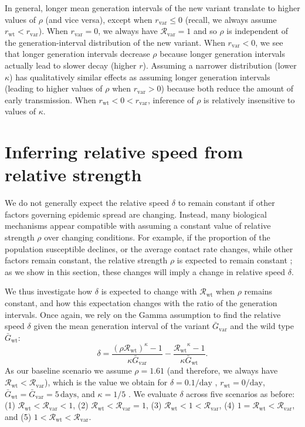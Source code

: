 \documentclass[12pt]{article}
\newcommand{\vvvar}{\mathrm{var}}
\newcommand{\wwwt}{\mathrm{wt}}
\newcommand{\rx}[1]{\ensuremath{{r}_{#1}}\xspace}
\newcommand{\rw}{\rx{\wwwt}}
\newcommand{\rv}{\rx{\vvvar}}
\newcommand{\Rx}[1]{\ensuremath{{\mathcal R}_{#1}}\xspace}
\newcommand{\Rw}{\Rx{\wwwt}}
\newcommand{\Rv}{\Rx{\vvvar}}
\newcommand{\pday}{\ensuremath{/\textrm{day}}}
\newcommand{\Gx}[1]{\ensuremath{{\bar G}_{#1}}\xspace}
\newcommand{\Gw}{\Gx{\wwwt}}
\newcommand{\Gv}{\Gx{\vvvar}}
\begin{document}
In general, longer mean generation intervals of the new variant translate to higher values of $\rho$ (and vice versa), except when $\rv \leq 0$ (recall, we always assume $\rw<\rv$).
When $\rv = 0$, we always have $\Rv = 1$ and so $\rho$ is independent of the generation-interval distribution of the new variant.
When $\rv < 0$, we see that longer generation intervals decrease $\rho$ because longer generation intervals actually lead to slower decay (higher $r$).
Assuming a narrower distribution (lower $\kappa$) has qualitatively similar effects as assuming longer generation intervals (leading to higher values of $\rho$ when $\rv > 0$) because both reduce the amount of early transmission.
When $\rw < 0 < \rv$, inference of $\rho$ is relatively insensitive to values of $\kappa$.

\section{Inferring relative speed from relative strength}

We do not generally expect the relative speed $\delta$ to remain constant if other factors governing epidemic spread are changing.
Instead, many biological mechanisms appear compatible with assuming a constant value of relative strength $\rho$ over changing conditions.
For example, if the proportion of the population susceptible declines, or the average contact rate changes, while other factors remain constant, the relative strength $\rho$ is expected to remain constant \citep{leung2017monitoring,leung2020empirical,di2021impact,leung2021early}; 
as we show in this section, these changes will imply a change in relative speed $\delta$.

We thus investigate how $\delta$ is expected to change with \Rw when $\rho$ remains constant, and how this expectation changes with the ratio of the generation intervals. 
Once again, we rely on the Gamma assumption \citep{park2019practical} to find the relative speed $\delta$ given the mean generation interval of the variant $\Gv$ and the wild type $\Gw$:
\begin{equation}
\delta = \frac{(\rho \Rw)^{\kappa} - 1}{\kappa \Gv} - \frac{\Rw^{\kappa} - 1}{\kappa \Gw}.
\end{equation}
As our baseline scenario we assume $\rho = 1.61$ (and therefore, we always have $\Rw < \Rv$), which is the value we obtain for $\delta=0.1\pday$ \citep{davies2021estimated}, $\rw=0\pday$, $\Gw = \Gv = 5\,\textrm{days}$, and $\kappa = 1/5$ \citep{ferretti2020quantifying}.
We evaluate $\delta$ across five scenarios as before: (1) $\Rw < \Rv < 1$, (2) $\Rw < \Rv = 1$, (3) $\Rw < 1 < \Rv$, (4) $1 = \Rw < \Rv$, and (5) $1 < \Rw < \Rv$.
\end{document}
